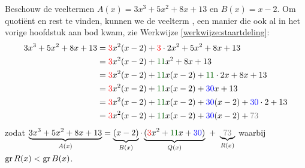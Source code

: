 \documentclass{ximera}
\begin{document}
\begin{werkwijze}
Beschouw de veeltermen $A(x) = 3x^3+5x^2+8x+13$ en $B(x) = x-2$. Om quoti\"ent en rest te vinden, kunnen we de veelterm 
, een manier die ook al in het vorige hoofdstuk aan bod kwam, zie Werkwijze \ref{werkwijze:staartdeling}:
\begin{align*}
3x^3+5x^2+8x+13
& = {\red{3}}x^2(x-2) + {\red{3}}\cdot 2x^2 + 5x^2 + 8x + 13 \\
& = {\red{3}}x^2(x-2) + {\mathcolor{graf}{11}}x^2 + 8x + 13 \\
& = {\red{3}}x^2(x-2) + {\mathcolor{graf}{11}}x(x-2) + {\mathcolor{graf}{11}}\cdot 2x + 8x + 13 \\
& = {\red{3}}x^2(x-2) + {\mathcolor{graf}{11}}x(x-2) + {\blue{30}}x + 13 \\
& = {\red{3}}x^2(x-2) + {\mathcolor{graf}{11}}x(x-2) + {\blue{30}}(x-2) + {\blue{30}} \cdot 2 + 13 \\
& = {\red{3}}x^2(x-2) + {\mathcolor{graf}{11}}x(x-2) + {\blue{30}}(x-2) + {\mathcolor{gray}{73}} %
\end{align*}
zodat $\D \underbrace{3x^3+5x^2+8x+13}_{A(x)} = \underbrace{(x-2)}_{B(x)}\cdot\underbrace{({\red{3}}x^2 + {\mathcolor{graf}{11}}x + {\blue{30}})}_{Q(x)} \,\, + \,\, \underbrace{{\mathcolor{gray}{73}}}_{R(x)}$ waarbij $\operatorname{gr} R(x) < \operatorname{gr} B(x)$.


\end{werkwijze}
\end{document}
